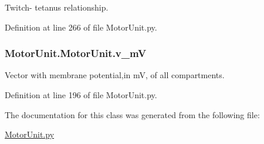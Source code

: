 Twitch-\/ tetanus relationship. 



Definition at line 266 of file Motor\+Unit.\+py.

\subsubsection[{\texorpdfstring{v\+\_\+mV}{v_mV}}]{\setlength{\rightskip}{0pt plus 5cm}Motor\+Unit.\+Motor\+Unit.\+v\+\_\+mV}\hypertarget{class_motor_unit_1_1_motor_unit_aa8968f89250895ae2ae572e9106709f2}{}\label{class_motor_unit_1_1_motor_unit_aa8968f89250895ae2ae572e9106709f2}


Vector with membrane potential,in mV, of all compartments. 



Definition at line 196 of file Motor\+Unit.\+py.



The documentation for this class was generated from the following file\+:\begin{DoxyCompactItemize}
\item 
\hyperlink{_motor_unit_8py}{Motor\+Unit.\+py}\end{DoxyCompactItemize}
